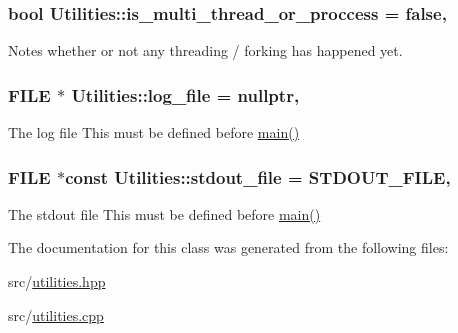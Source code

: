 \subsubsection[{\texorpdfstring{is\+\_\+multi\+\_\+thread\+\_\+or\+\_\+proccess}{is_multi_thread_or_proccess}}]{\setlength{\rightskip}{0pt plus 5cm}bool Utilities\+::is\+\_\+multi\+\_\+thread\+\_\+or\+\_\+proccess = false\hspace{0.3cm}{\ttfamily [static]}, {\ttfamily [private]}}\hypertarget{class_utilities_af893d8dcd5bb1ba3fc72fc108536bcbc}{}\label{class_utilities_af893d8dcd5bb1ba3fc72fc108536bcbc}


Notes whether or not any threading / forking has happened yet. 

\subsubsection[{\texorpdfstring{log\+\_\+file}{log_file}}]{\setlength{\rightskip}{0pt plus 5cm}F\+I\+LE $\ast$ Utilities\+::log\+\_\+file = nullptr\hspace{0.3cm}{\ttfamily [static]}, {\ttfamily [private]}}\hypertarget{class_utilities_a63ce9d08b6459cd102bb368a274aca07}{}\label{class_utilities_a63ce9d08b6459cd102bb368a274aca07}


The log file This must be defined before \hyperlink{shadow__stack_8cpp_a0ddf1224851353fc92bfbff6f499fa97}{main()} 

\subsubsection[{\texorpdfstring{stdout\+\_\+file}{stdout_file}}]{\setlength{\rightskip}{0pt plus 5cm}F\+I\+LE $\ast$const Utilities\+::stdout\+\_\+file = {\bf S\+T\+D\+O\+U\+T\+\_\+\+F\+I\+LE}\hspace{0.3cm}{\ttfamily [static]}, {\ttfamily [private]}}\hypertarget{class_utilities_a224eea0a234ac9877a8334f74fc89ef0}{}\label{class_utilities_a224eea0a234ac9877a8334f74fc89ef0}


The stdout file This must be defined before \hyperlink{shadow__stack_8cpp_a0ddf1224851353fc92bfbff6f499fa97}{main()} 



The documentation for this class was generated from the following files\+:\begin{DoxyCompactItemize}
\item 
src/\hyperlink{utilities_8hpp}{utilities.\+hpp}\item 
src/\hyperlink{utilities_8cpp}{utilities.\+cpp}\end{DoxyCompactItemize}
